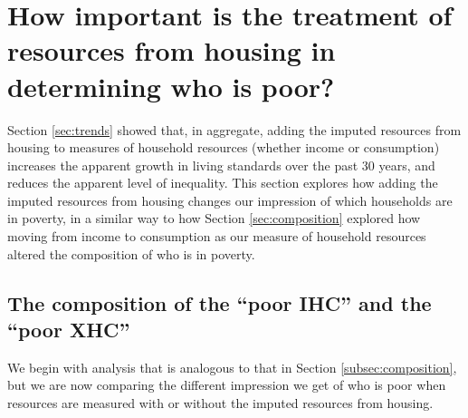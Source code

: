 \section{How important is the treatment of resources from housing in determining who is poor?}\label{sec:housing}

Section \ref{sec:trends} showed that, in aggregate, adding the imputed resources from housing to measures of household resources (whether income or consumption) increases the apparent growth in living standards over the past 30 years, and reduces the apparent level of inequality.   This section explores how adding the imputed resources from housing changes our impression of which households are in poverty, in a similar way to how Section \ref{sec:composition} explored how moving from income to consumption as our measure of household resources altered the composition of who is in poverty. 

\subsection{The composition of the ``poor IHC'' and the ``poor XHC''}\label{subsec:housing}

We begin with analysis that is analogous to that in Section \ref{subsec:composition}, but we are now comparing the different impression we get of who is poor when resources are measured with or without the imputed resources from housing.  


